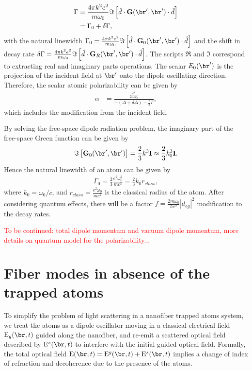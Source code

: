 \documentclass[]{report}
\begin{document}
\begin{align}
\Gamma &= \frac{4\pi k^2e^2}{m\omega_0}\Im\left[\hat{d}\cdot\mathbf{G}(\br',\br')\cdot \hat{d}\right]\\
&= \Gamma_0 + \delta \Gamma,
\end{align}
with the natural linewidth $ \Gamma_0=\frac{4\pi k^2 e^2}{m\omega_0}\Im\left[\hat{d}\cdot\mathbf{G}_0(\br',\br')\cdot \hat{d}\right] $ and the shift in decay rate $ \delta\Gamma=\frac{4\pi k^2e^2}{m\omega_0}\Im\left[\hat{d}\cdot\mathbf{G}_R(\br',\br')\cdot \hat{d}\right] $. The scripts $ \Re $ and $ \Im $ correspond to extracting real and imaginary parts operations. The scalar $ E_0(\br') $ is the projection of the incident field at $ \br' $ onto the dipole oscillating direction. Therefore, the scalar atomic polarizability can be given by
\begin{align}
\alpha &= \frac{\frac{e^2}{2m\omega_0}}{-(\Delta+\delta \Delta)-\frac{i}{2}\Gamma},
\end{align}
which includes the modification from the incident field. 

By solving the free-space dipole radiation problem, the imaginary part of the free-space Green function can be given by
\begin{align}
\Im\left[\mathbf{G}_0(\br',\br') \right] =\frac{2}{3}k^3 \mathbf{I} \approx \frac{2}{3}k^3_0\mathbf{I}.
\end{align}
Hence the natural linewidth of an atom can be given by
\begin{align}
\Gamma_0 = \frac{2}{3}\frac{e^2\omega_0^2}{mc^3}=\frac{2}{3}k_0r_{class},
\end{align}
where $ k_0=\omega_0/c $, and $ r_{class}= \frac{e^2\omega_0}{mc^2}$ is the classical radius of the atom. After considering quantum effects, there will be a factor $ f=\frac{2m\omega_0}{\hbar e^2}|d_{eg}|^2 $ modification to the decay rates. 

\textcolor{red}{To be continued: total dipole momentum and vacuum dipole momentum, more details on quantum model for the polarizability...}







\section{Fiber modes in absence of the trapped atoms}
To simplify the problem of light scattering in a nanofiber trapped atoms system, we treat the atoms as a dipole oscillator moving in a classical electrical field $ \mathrm{E}_{g}(\br,t) $ guided along the nanofiber, and re-emit a scattered optical field described by $ \mathrm{E}^s(\br,t) $ to interfere with the initial guided optical field. Formally, the total optical field $ \mathrm{E}(\br,t)= \mathrm{E}^g(\br,t)  + \mathrm{E}^s(\br,t) $ implies a change of index of refraction and decoherence due to the presence of the atoms. 
\end{document}
